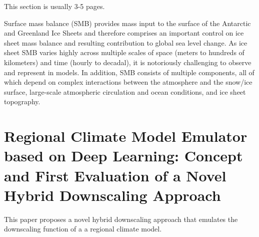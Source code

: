 \documentclass[a4paper,11pt,oneside]{report}
\begin{document}
This section is usually 3-5 pages.

Surface mass balance (SMB) provides mass input to the surface of the Antarctic and Greenland Ice Sheets and therefore comprises an important control on ice sheet mass balance and resulting contribution to global sea level change. As ice sheet SMB varies highly across multiple scales of space (meters to hundreds of kilometers) and time (hourly to decadal), it is notoriously challenging to observe and represent in models. In addition, SMB consists of multiple components, all of which depend on complex interactions between the atmosphere and the snow/ice surface, large-scale atmospheric circulation and ocean conditions, and ice sheet topography.~\cite{Lenaerts}


\section{Regional Climate Model Emulator based on Deep Learning: Concept and First Evaluation of a Novel Hybrid Downscaling Approach \cite{Doury}}
This paper proposes a novel hybrid downscaling approach that emulates the downscaling function of a a regional climate model.
\end{document}
